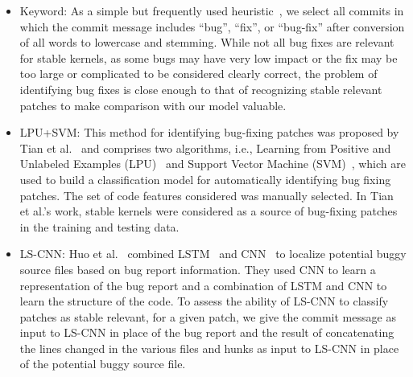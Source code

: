 \begin{itemize}[leftmargin=0.4cm]
\item Keyword: As a simple but frequently used
  heuristic~\cite{tian2012identifying}, we select all commits in which the
  commit message includes ``bug'', ``fix'', or ``bug-fix'' after conversion
  of all words to lowercase and stemming.  While not all bug fixes are
  relevant for stable kernels, as some bugs may have very low impact or the
  fix may be too large or complicated to be considered clearly correct, the
  problem of identifying bug fixes is close enough to that of recognizing
  stable relevant patches to make comparison with our model valuable.
\item LPU+SVM: This method for identifying bug-fixing patches was proposed
  by Tian et
  al.~\cite{tian2012identifying} and comprises two algorithms, i.e.,
  Learning from Positive and Unlabeled Examples
  (LPU)~\cite{joachims1999svmlight, letouzey2000learning, liu2003building}
  and Support Vector Machine (SVM)~\cite{cauwenberghs2001incremental,
    cristianini2000introduction}, which are used to build a classification
  model for automatically identifying bug fixing patches. The set of code
  features considered was manually selected. In Tian et al.'s work, stable kernels were
  considered as a source of bug-fixing patches in the training and testing
  data.

 \item LS-CNN: Huo et al.~\cite{huo2017enhancing} combined
   LSTM~\cite{hochreiter1997long} and CNN~\cite{lecun1998gradient} 
     to localize potential buggy source files based on bug report
   information. They used CNN to learn a representation of the bug report
   and a combination of LSTM and CNN 
     to learn the structure of the code.  To assess the ability of
   LS-CNN to classify patches as stable relevant, for a given patch, we
   give the commit message as input to LS-CNN in place of the bug
   report and the result of concatenating the lines changed in the various
   files and hunks as input to LS-CNN in place of the potential buggy
   source file.
  


\end{itemize}
